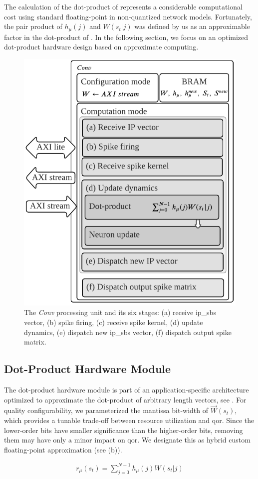 The calculation of the dot-product of  represents a considerable computational cost using standard floating-point in non-quantized network models. Fortunately, the pair product of $h_{\mu}(j)$ and $W(s_t|j)$ was defined by us as an approximable factor in the dot-product of . In the following section, we focus on an optimized dot-product hardware design based on approximate computing.


\begin{figure}[b!]
	\centering
	\includegraphics[width=0.5\columnwidth]{./chapters/sbs_accelerator/figures/sbs_conv.pdf}
	\caption{The \emph{Conv} processing unit and its six stages: (a) receive \gls{ip_sbs} vector, (b) spike firing, (c) receive spike kernel, (d) update dynamics, (e) dispatch new \gls{ip_sbs} vector, (f) dispatch output spike matrix.}
	\label{fig:hw_conv}
\end{figure}

\subsection{Dot-Product Hardware Module}
\label{sec:dot-product_hardware_module}
The dot-product hardware module is part of an application-specific architecture optimized to approximate the dot-product of arbitrary length vectors, see . For quality configurability, we parameterized the mantissa bit-width of $\vec{W}(s_t)$, which provides a tunable trade-off between resource utilization and \gls{qor}. Since the lower-order bits have smaller significance than the higher-order bits, removing them may have only a minor impact on \gls{qor}. We designate this as hybrid custom floating-point approximation (see {}(b)).

\begin{eqnarray} \label{eq:dot_product}
r_{\mu}\left(s_t\right)=\sum_{j=0}^{N-1}h_{\mu}(j)W(s_t|j)
\end{eqnarray}

